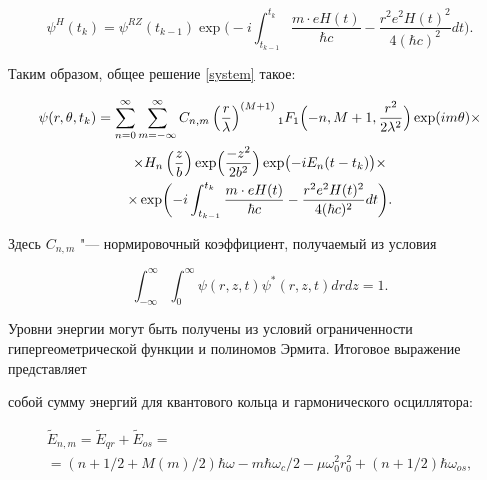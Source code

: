 \begin{equation*}


\psi^H(t_k)=\psi^{RZ}(t_{k-1})\exp\biggl(-i \int^{t_k}_{t_{k-1}}\dfrac{m\cdot eH(t)}{\hbar c}-\dfrac{r^2e^2H(t)^2}{4(\hbar

c)^2}dt\biggr).

\end{equation*}

Таким образом, общее решение \eqref{system} такое:

\begin{multline*}


 \psi(r,\theta,t_k) = \sum^{\infty}_{n=0}\sum^{\infty}_{m=-\infty}C_{n,m}\left(\dfrac{r}{\lambda}\right)^{(M+1)}

{_1F_1}\Bigl(-n,M+1,\dfrac{r^2}{2\lambda^2}\Bigr) \exp(im\theta)\times\\

\times

H_n\left(\dfrac{z}{b}\right)\exp\Bigl(\dfrac{-z^2}{2b^2}\Bigr)\exp\bigl(-iE_n(t-t_k)\bigr)\times\\

\times

\exp\biggl(-i \int^{t_k}_{t_{k-1}}\dfrac{m\cdot eH(t)}{\hbar c}-\dfrac{r^2e^2H(t)^2}{4(\hbar c)^2}dt\biggr).

\end{multline*}

Здесь $C_{n,m}$ "--- нормировочный коэффициент, получаемый из условия

\begin{equation*}

\int_{-\infty}^{\infty}\int_0^{\infty} \psi(r,z,t)\psi^*(r,z,t) drdz = 1.

\end{equation*}

Уровни энергии могут быть получены из условий ограниченности гипергеометрической функции и полиномов Эрмита. Итоговое выражение представляет

собой сумму энергий для квантового кольца и гармонического осциллятора:

\begin{multline*}


\tilde{E}_{n,m} =

\tilde{E}_{qr}+\tilde{E}_{os}= \\ = (n+1/2+M(m)/2)\hbar\omega-m\hbar\omega_c/2-\mu\omega_0^2r_0^2+(n+1/2)\hbar\omega_{os},

\end{multline*}

